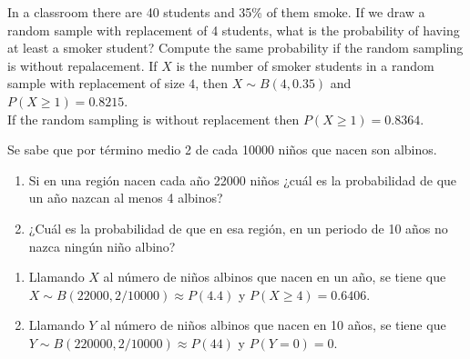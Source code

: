 {In a classroom there are 40 students and 35\% of them smoke.
If we draw a random sample with replacement of 4 students, what is the probability of having at least a smoker student?
Compute the same probability if the random sampling is without repalacement.}
{If $X$ is the number of smoker students in a random sample with replacement of size $4$, then $X\sim
B(4,0.35)$ and $P(X\geq 1)=0.8215$.\\
If the random sampling is without replacement then $P(X\geq 1)= 0.8364$.}
{}


{Se sabe que por término medio 2 de cada 10000 niños que nacen son albinos.
\begin{enumerate}
\item Si en una región nacen cada año 22000 niños ¿cuál es la probabilidad de que un año nazcan al menos 4 albinos?
\item ¿Cuál es la probabilidad de que en esa región, en un periodo de 10 años no nazca ningún niño albino?
\end{enumerate}
}
{
\begin{enumerate}
\item Llamando $X$ al número de niños albinos que nacen en un año, se tiene que $X\sim B(22000,2/10000)\approx
P(4.4)$ y $P(X\geq 4)=0.6406$.
\item Llamando $Y$ al número de niños albinos que nacen en 10 años, se tiene que $Y\sim B(220000,2/10000)\approx
P(44)$ y $P(Y=0)=0$.
\end{enumerate}
}
{}


